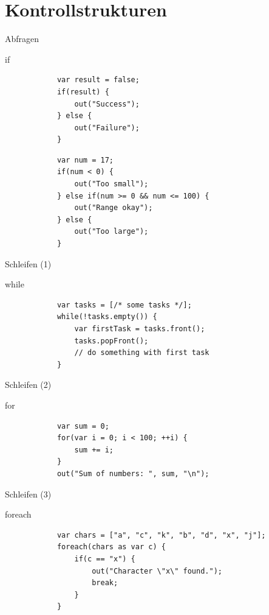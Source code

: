 \documentclass[ucs,9pt]{beamer}
\begin{document}
\section{Kontrollstrukturen}
\begin{frame}[fragile]{Abfragen}
	\begin{block}{if}
		\begin{lstlisting}
			var result = false;
			if(result) {
			    out("Success");
			} else {
			    out("Failure");
			}
		\end{lstlisting}
		\begin{lstlisting}
			var num = 17;
			if(num < 0) {
			    out("Too small");
			} else if(num >= 0 && num <= 100) {
			    out("Range okay");
			} else {
			    out("Too large");
			}
		\end{lstlisting}
	\end{block}
\end{frame}

\begin{frame}[fragile]{Schleifen (1)}
	\begin{block}{while}
		\begin{lstlisting}
			var tasks = [/* some tasks */];
			while(!tasks.empty()) {
			    var firstTask = tasks.front();
			    tasks.popFront();
			    // do something with first task
			}
		\end{lstlisting}
	\end{block}
\end{frame}

\begin{frame}[fragile]{Schleifen (2)}
	\begin{block}{for}
		\begin{lstlisting}
			var sum = 0;
			for(var i = 0; i < 100; ++i) {
			    sum += i;
			}
			out("Sum of numbers: ", sum, "\n");
		\end{lstlisting}
	\end{block}
\end{frame}

\begin{frame}[fragile]{Schleifen (3)}
	\begin{block}{foreach}
		\begin{lstlisting}
			var chars = ["a", "c", "k", "b", "d", "x", "j"];
			foreach(chars as var c) {
			    if(c == "x") {
			        out("Character \"x\" found.");
			        break;
			    }
			}
		\end{lstlisting}
	\end{block}
\end{frame}
\end{document}
